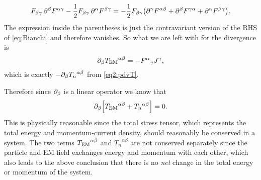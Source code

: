 \documentclass[11pt,a4paper, 
swedish, english %
]{article}
\begin{document}
\begin{equation}
F_{\beta\gamma} \,\partial^\beta F^{\alpha\gamma}
-\frac{1}{2}F_{\beta\gamma}\,\partial^\alpha F^{\beta\gamma}=
-\frac{1}{2}F_{\beta\gamma}\qty( 
\partial^\gamma F^{\alpha\beta}
+\partial^\beta F^{\gamma\alpha}
+\partial^\alpha F^{\beta\gamma}).
\end{equation}
The expression inside the parentheses is just the contravariant version
of the RHS of \eqref{eq:Bianchi} and therefore vanishes.
So what we are left with for the divergence is
\begin{equation}
\partial_{\beta}{T_{\text{EM}}}^{\alpha\beta}=-{F^{\alpha}}_\gamma J^\gamma,
\end{equation}
which is exactly $-\partial_\beta{T_n}^{\alpha\beta}$ from \eqref{eq2:pdvT}.

Therefore since $\partial_\beta$ is a linear operator we know that
\begin{equation}
\partial_{\beta}\qty[{T_{\text{EM}}}^{\alpha\beta}+{T_n}^{\alpha\beta}]=0.
\end{equation}
This is physically reasonable since the total stress tensor, which
represents the total energy and momentum-current density, should
reasonably be conserved in a system. The two terms
${T_{\text{EM}}}^{\alpha\beta}$ and ${T_n}^{\alpha\beta}$ are not conserved
separately since the particle and EM field exchanges energy and
momentum with each other, which also leads to the above conclusion
that there is no \emph{net} change in the total energy or momentum of
the system.









\clearpage %
\appendix  %


\end{document}
